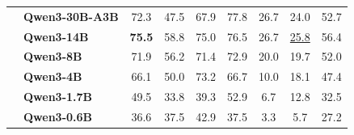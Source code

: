 \documentclass[dvipsnames]{article}
\begin{document}
\begin{table}[tbp]
{\begin{tabular}{clccccccc}
 & \textbf{Qwen3-30B-A3B} & 72.3 & 47.5 & 67.9 & 77.8 & 26.7 & 24.0 & 52.7 \\
 & \textbf{Qwen3-14B} & \textbf{75.5} & 58.8 & 75.0 & 76.5 & 26.7 & \underline{25.8} & 56.4 \\
 & \textbf{Qwen3-8B} & 71.9 & 56.2 & 71.4 & 72.9 & 20.0 & 19.7 & 52.0 \\
 & \textbf{Qwen3-4B} & 66.1 & 50.0 & 73.2 & 66.7 & 10.0 & 18.1 & 47.4 \\
 & \textbf{Qwen3-1.7B} & 49.5 & 33.8 & 39.3 & 52.9 & 6.7 & 12.8 & 32.5 \\
 & \textbf{Qwen3-0.6B} & 36.6 & 37.5 & 42.9 & 37.5 & 3.3 & 5.7 & 27.2 \\
\bottomrule
\end{tabular}
}
\end{table}
\end{document}
